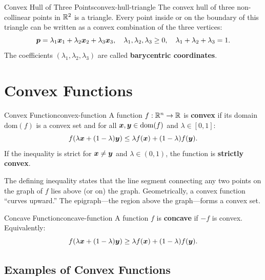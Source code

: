 \documentclass[../../main.tex]{subfiles}
\begin{document}
\begin{example}{Convex Hull of Three Points}{convex-hull-triangle}
The convex hull of three non-collinear points in $\mathbb{R}^2$ is a triangle. Every point inside or on the boundary of this triangle can be written as a convex combination of the three vertices:
\[
    \boldsymbol{p} = \lambda_1 \boldsymbol{x}_1 + \lambda_2 \boldsymbol{x}_2 + \lambda_3 \boldsymbol{x}_3, \quad \lambda_1, \lambda_2, \lambda_3 \geq 0, \quad \lambda_1 + \lambda_2 + \lambda_3 = 1.
\]
The coefficients $(\lambda_1, \lambda_2, \lambda_3)$ are called \textbf{barycentric coordinates}.
\end{example}

\section{Convex Functions}
\label{sec:convex-functions}

\begin{definition}{Convex Function}{convex-function}
A function $f: \mathbb{R}^n \to \mathbb{R}$ is \textbf{convex} if its domain $\text{dom}(f)$ is a convex set and for all $\boldsymbol{x}, \boldsymbol{y} \in \text{dom}(f)$ and $\lambda \in [0, 1]$:
\[
    f(\lambda \boldsymbol{x} + (1 - \lambda) \boldsymbol{y}) \leq \lambda f(\boldsymbol{x}) + (1 - \lambda) f(\boldsymbol{y}).
\]
If the inequality is strict for $\boldsymbol{x} \neq \boldsymbol{y}$ and $\lambda \in (0, 1)$, the function is \textbf{strictly convex}.
\end{definition}

\begin{intuition}
The defining inequality states that the line segment connecting any two points on the graph of $f$ lies above (or on) the graph. Geometrically, a convex function ``curves upward.'' The epigraph---the region above the graph---forms a convex set.
\end{intuition}

\begin{definition}{Concave Function}{concave-function}
A function $f$ is \textbf{concave} if $-f$ is convex. Equivalently:
\[
    f(\lambda \boldsymbol{x} + (1 - \lambda) \boldsymbol{y}) \geq \lambda f(\boldsymbol{x}) + (1 - \lambda) f(\boldsymbol{y}).
\]
\end{definition}

\subsection{Examples of Convex Functions}
\end{document}
